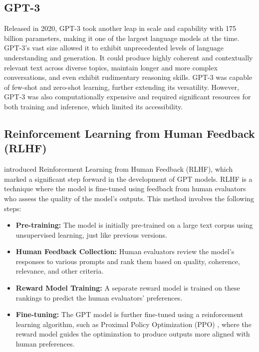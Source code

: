 \documentclass[a4paper,12pt,twoside]{ThesisStyle}
\begin{document}
\subsection{GPT-3}
\label{subsec:gpt-3}

Released in 2020, GPT-3 \cite{Brown2020GPT3} took another leap in scale and capability with 175 billion parameters, making it one of the largest language models at the time. GPT-3's vast size allowed it to exhibit unprecedented levels of language understanding and generation. It could produce highly coherent and contextually relevant text across diverse topics, maintain longer and more complex conversations, and even exhibit rudimentary reasoning skills. GPT-3 was capable of few-shot and zero-shot learning, further extending its versatility. However, GPT-3 was also computationally expensive and required significant resources for both training and inference, which limited its accessibility.

\subsection{Reinforcement Learning from Human Feedback (RLHF)}
\label{subsec:rlhf}

\cite{Ouyang2022RLHF} introduced Reinforcement Learning from Human Feedback (RLHF), which marked a significant step forward in the development of GPT models. RLHF is a technique where the model is fine-tuned using feedback from human evaluators who assess the quality of the model's outputs. This method involves the following steps:


\begin{itemize}
  \item \textbf{Pre-training:} The model is initially pre-trained on a large text corpus using unsupervised learning, just like previous versions.
  \item \textbf{Human Feedback Collection:} Human evaluators review the model's responses to various prompts and rank them based on quality, coherence, relevance, and other criteria.
  \item \textbf{Reward Model Training:} A separate reward model is trained on these rankings to predict the human evaluators' preferences.
  \item \textbf{Fine-tuning:} The GPT model is further fine-tuned using a reinforcement learning algorithm, such as Proximal Policy Optimization (PPO) \cite{Schulman2017ProximalPolicyOptimizationAlgorithms}, where the reward model guides the optimization to produce outputs more aligned with human preferences.
\end{itemize}
\end{document}
